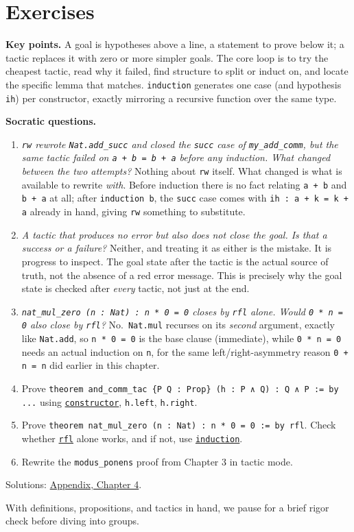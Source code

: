 \section{Exercises}\label{sec:04-tactics:06-exercises:1}

\textbf{Key points.} A goal is hypotheses above a line, a statement to prove below it; a tactic replaces it with zero or more simpler goals. The core loop is to try the cheapest tactic, read why it failed, find structure to split or induct on, and locate the specific lemma that matches. \texttt{induction} generates one case (and hypothesis \texttt{ih}) per constructor, exactly mirroring a recursive function over the same type.

\textbf{Socratic questions.}

\begin{enumerate}
\def\labelenumi{\arabic{enumi}.}
\item
  \emph{\texttt{rw} rewrote \texttt{Nat.add\_\allowbreak{}succ} and closed the \texttt{succ} case of \texttt{my\_\allowbreak{}add\_\allowbreak{}comm}, but the same tactic failed on \texttt{a + b = b + a} before any induction. What changed between the two attempts?} Nothing about \texttt{rw} itself. What changed is what is available to rewrite \emph{with}. Before induction there is no fact relating \texttt{a + b} and \texttt{b + a} at all; after \texttt{induction b}, the \texttt{succ} case comes with \texttt{ih : a + k = k + a} already in hand, giving \texttt{rw} something to substitute.
\item
  \emph{A tactic that produces no error but also does not close the goal. Is that a success or a failure?} Neither, and treating it as either is the mistake. It is progress to inspect. The goal state after the tactic is the actual source of truth, not the absence of a red error message. This is precisely why the goal state is checked after \emph{every} tactic, not just at the end.
\item
  \emph{\texttt{nat\_\allowbreak{}mul\_\allowbreak{}zero (n : Nat) : n * 0 = 0} closes by \texttt{rfl} alone. Would \texttt{0 * n = 0} also close by \texttt{rfl}?} No.~\texttt{Nat.mul} recurses on its \emph{second} argument, exactly like \texttt{Nat.add}, so \texttt{n * 0 = 0} is the base clause (immediate), while \texttt{0 * n = 0} needs an actual induction on \texttt{n}, for the same left/right-asymmetry reason \texttt{0 + n = n} did earlier in this chapter.
\item
  Prove \texttt{theorem and\_\allowbreak{}comm\_\allowbreak{}tac \{P Q : Prop\} (h : P ∧ Q) : Q ∧ P := by ...} using \href{https://lean-lang.org/doc/reference/latest/Tactic-Proofs/Tactic-Reference/}{\texttt{constructor}}, \texttt{h.left}, \texttt{h.right}.
\item
  Prove \texttt{theorem nat\_\allowbreak{}mul\_\allowbreak{}zero (n : Nat) : n * 0 = 0 := by rfl}. Check whether \href{https://lean-lang.org/doc/reference/latest/Tactic-Proofs/Tactic-Reference/}{\texttt{rfl}} alone works, and if not, use \href{https://lean-lang.org/doc/reference/latest/Tactic-Proofs/Tactic-Reference/}{\texttt{induction}}.
\item
  Rewrite the \texttt{modus\_\allowbreak{}ponens} proof from Chapter 3 in tactic mode.
\end{enumerate}

Solutions: \hyperref[sec:14-appendix-solutions:03-chapter-4:1]{Appendix, Chapter 4}.

With definitions, propositions, and tactics in hand, we pause for a brief rigor check before diving into groups.
